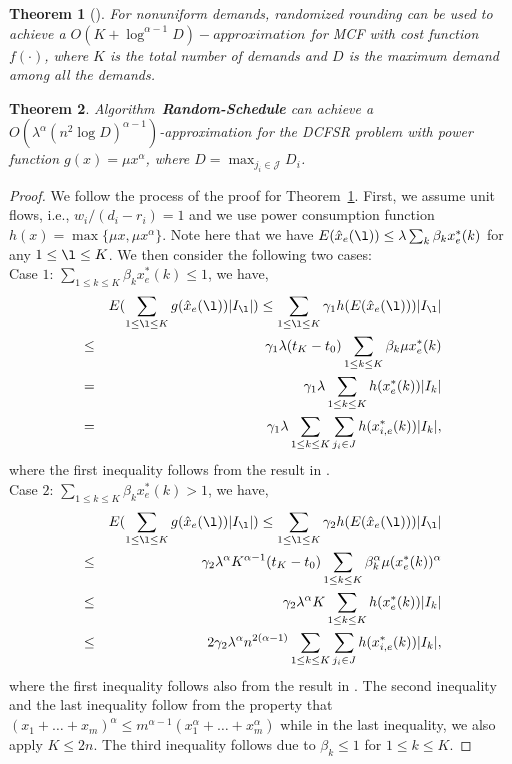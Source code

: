 \documentclass[10pt, conference, compsocconf]{IEEEtran}
\newtheorem{theorem}{Theorem}
\begin{document}
\begin{theorem}[\cite{Andrews_Fernandez-SS-2010}]
\label{thm:mcf}
For nonuniform demands, randomized rounding can be used to achieve a $O\left(K+\log^{\alpha-1}D\right)-approximation$ for MCF with cost function $f(\cdot)$, where $K$ is the total number of demands and $D$ is the maximum demand among all the demands.
\end{theorem}

\begin{theorem}
 Algorithm~\textbf{Random-Schedule} can achieve a $O\left(\lambda^{\alpha}(n^2 \log D)^{\alpha-1}\right)$-approximation for the DCFSR problem with power function $g(x) = \mu x^{\alpha}$, where $D = \max_{j_i \in \mathcal{J}} D_i$.
\end{theorem}

\begin{proof}
We follow the process of the proof for Theorem~\ref{thm:mcf}. First, we assume unit flows, i.e., $w_i/(d_i-r_i) = 1$ and we use power consumption function $h(x) = \max\{\mu x, \mu x^{\alpha}\}$. Note here that we have $E(\hat{x}_e(\l)) \leq \lambda \sum_{k} \beta_k x^*_{e}(k)$ for any $1 \leq \l \leq K$. We then consider the following two cases:\\
Case $1$: $\sum_{1 \leq k\leq K} \beta_k x^*_{e}(k) \leq 1$, we have,
\begin{eqnarray}
&&E(\sum_{1\leq \l \leq K}g(\hat{x}_e(\l)) |I_{\l}|) \leq  \sum_{1\leq \l \leq K}\gamma_1 h(E(\hat{x}_e(\l)))|I_{\l}| \nonumber\\
							& \leq & \gamma_1 \lambda (t_K-t_0) \sum_{1 \leq k\leq K} \beta_k \mu x^*_{e}(k) \nonumber\\
							& = & \gamma_1 \lambda \sum_{1\leq k \leq K} h(x^*_e(k))|I_k| \\
							& = & \gamma_1 \lambda \sum_{1\leq k \leq K} \sum_{j_i \in J}h(x^*_{i,e}(k)) |I_k|, \nonumber
\end{eqnarray}
where the first inequality follows from the result in \cite{Andrews_Fernandez-SS-2010}.\\
Case $2$: $\sum_{1 \leq k\leq K} \beta_k x^*_{e}(k) > 1$, we have,
\begin{eqnarray}
&&E(\sum_{1\leq \l \leq K}g(\hat{x}_e(\l)) |I_{\l}|) \leq \sum_{1\leq \l \leq K}\gamma_2 h(E(\hat{x}_e(\l)))|I_{\l}| \nonumber\\
			&\leq& \gamma_2 \lambda^{\alpha} K^{\alpha-1} (t_K-t_0) \sum_{1 \leq k\leq K} \beta_k^{\alpha} \mu (x^*_{e}(k))^{\alpha} \nonumber\\
			&\leq& \gamma_2 \lambda^{\alpha} K \sum_{1\leq k \leq K} h(x^*_e(k))|I_k|  \\
			& \leq& 2\gamma_2 \lambda^{\alpha} n^{2(\alpha-1)} \sum_{1\leq k \leq K} \sum_{j_i \in J} h(x^*_{i,e}(k))|I_k|, \nonumber
\end{eqnarray}
where the first inequality follows also from the result in \cite{Andrews_Fernandez-SS-2010}. The second inequality and the last inequality follow from the property that $(x_1+\ldots+x_m)^{\alpha} \leq m^{\alpha-1}(x_1^{\alpha} + \ldots + x_m^{\alpha})$ while in the last inequality, we also apply $K \leq 2n$. The third inequality follows due to $\beta_k \leq 1$ for $1\leq k \leq K$. 


\end{proof}
\end{document}
